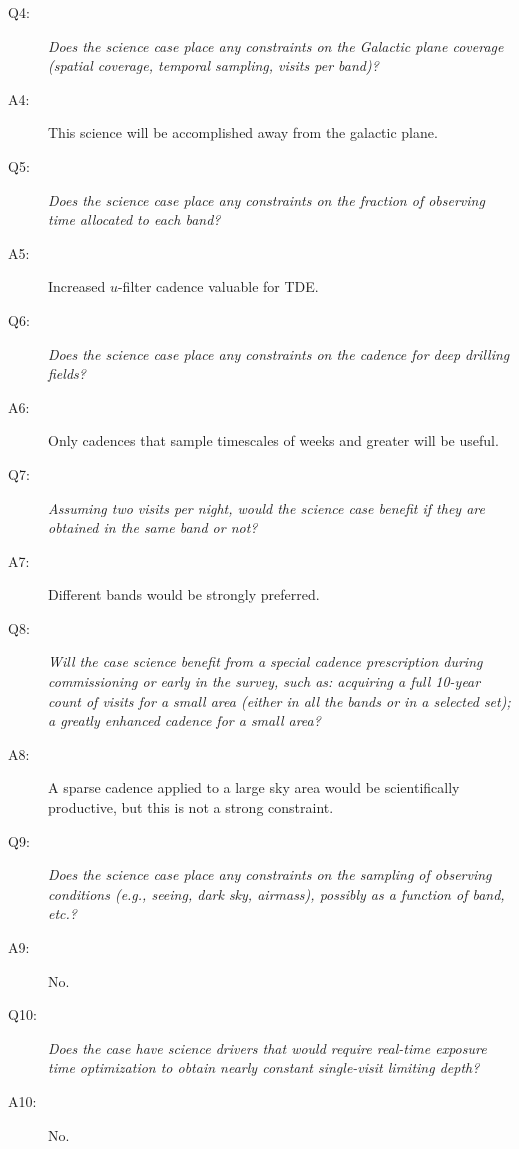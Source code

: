 \begin{description}
 \item[Q4:] {\it Does the science case place any constraints on the
 Galactic plane coverage (spatial coverage, temporal sampling, visits per
 band)?}

 \item[A4:] This science will be accomplished away from the galactic plane.

 \item[Q5:] {\it Does the science case place any constraints on the
 fraction of observing time allocated to each band?}

 \item[A5:] Increased $u$-filter cadence valuable for TDE.

 \item[Q6:] {\it Does the science case place any constraints on the
 cadence for deep drilling fields?}

 \item[A6:] Only cadences that sample timescales of weeks and greater will be useful.

 \item[Q7:] {\it Assuming two visits per night, would the science case
 benefit if they are obtained in the same band or not?}

 \item[A7:] Different bands would be strongly preferred.

 \item[Q8:] {\it Will the case science benefit from a special cadence
 prescription during commissioning or early in the survey, such as:
 acquiring a full 10-year count of visits for a small area (either in all
 the bands or in a  selected set); a greatly enhanced cadence for a small
 area?}

 \item[A8:] A sparse cadence applied to a large sky area would be scientifically productive, but this is not a strong constraint.

 \item[Q9:] {\it Does the science case place any constraints on the
 sampling of observing conditions (e.g., seeing, dark sky, airmass),
 possibly as a function of band, etc.?}

 \item[A9:] No.

 \item[Q10:] {\it Does the case have science drivers that would require
 real-time exposure time optimization to obtain nearly constant
 single-visit limiting depth?}

 \item[A10:] No.

 \end{description}
